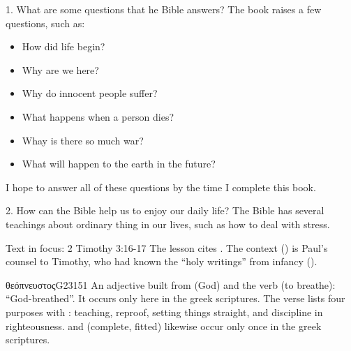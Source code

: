 \begin{campo}{1. What are some questions that he Bible answers?}
    The book raises a few questions, such as:
    \begin{itemize}
        \item How did life begin? 
        \item Why are we here? 
        \item Why do innocent people suffer? 
        \item What happens when a person dies? 
        \item Whay is there so much war? 
        \item What will happen to the earth in the future?
    \end{itemize}
    I hope to answer all of these questions by the time I complete this book.
\end{campo}

\begin{campo}{2. How can the Bible help us to enjoy our daily life?}
    The Bible has several teachings about ordinary thing in our lives, such as how to deal with stress.
\end{campo}

\begin{campo}{Text in focus: 2 Timothy 3:16-17}
The lesson cites . The context () is Paul's counsel to
Timothy, who had known the \enquote{holy writings} from infancy ().


\begin{lexico}{θεόπνευστος}{G2315}{1}
An adjective built from  (God) and the verb  (to breathe):
\enquote{God-breathed}. It occurs only here in the greek scriptures. The verse lists four
purposes with : teaching, reproof, setting things straight, and
discipline in righteousness.  and  (complete,
fitted) likewise occur only once in the greek scriptures.
\end{lexico}

\end{campo}

